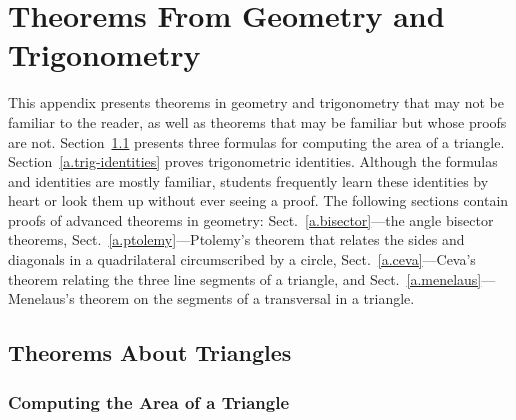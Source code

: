 
\chapter{Theorems From Geometry and Trigonometry}\label{a.trig}




This appendix presents theorems in geometry and trigonometry that may not be familiar to the reader, as well as theorems that may be familiar but whose proofs are not. Section~\ref{a.triangles} presents three formulas for computing the area of a triangle. Section~\ref{a.trig-identities} proves trigonometric identities. Although the formulas and identities are mostly familiar, students frequently learn these identities by heart or look them up without ever seeing a proof. The following sections contain proofs of advanced theorems in geometry: Sect.~\ref{a.bisector}---the angle bisector theorems, Sect.~\ref{a.ptolemy}---Ptolemy's theorem that relates the sides and diagonals in a quadrilateral circumscribed by a circle, Sect.~\ref{a.ceva}---Ceva's theorem relating the three line segments of a triangle, and Sect.~\ref{a.menelaus}---Menelaus's theorem on the segments of a transversal in a triangle.


\section{Theorems About Triangles}\label{a.triangles}


\subsection{Computing the Area of a Triangle}

